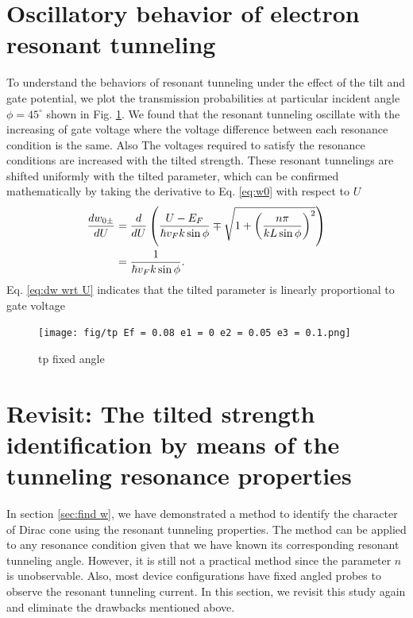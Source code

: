 \section{Oscillatory behavior of electron resonant tunneling} \label{sec:oscillation}
    To understand the behaviors of resonant tunneling under the effect of the tilt and gate potential, 
    we plot the transmission probabilities at particular incident angle $\phi = 45^{\circ}$ shown in Fig. \ref{fig:tp 45 deg}.
    We found that the resonant tunneling oscillate with the increasing of gate voltage where the voltage difference between each resonance condition is the same.
    Also The voltages required to satisfy the resonance conditions are increased with the tilted strength.
    These resonant tunnelings are shifted uniformly with the tilted parameter, which can be confirmed mathematically by taking the derivative to Eq. \ref{eq:w0} with respect to $U$
    \begin{align} \label{eq:dw wrt U}
        \frac{d w_{0\pm}}{dU} &= \frac{d}{dU} \left(\frac{U-E_F}{\hbar v_F k \sin{\phi}}\mp \sqrt{1+\left(\frac{n \pi}{k L \sin{\phi}}\right)^2}\right) \notag \\
                              &= \frac{1}{\hbar v_F k \sin{\phi}}.
    \end{align}
    Eq. \ref{eq:dw wrt U} indicates that the tilted parameter is linearly proportional to gate voltage
    \begin{figure}[H]
        \centering
            \texttt{[image: fig/tp Ef = 0.08 e1 = 0 e2 = 0.05 e3 = 0.1.png]}
            \caption{tp fixed angle}
        \label{fig:tp 45 deg}
    \end{figure}

\section{Revisit: The tilted strength identification by means of the tunneling resonance properties} \label{sec:find w 2}
    In section \ref{sec:find w}, we have demonstrated a method to identify the character of Dirac cone using the resonant tunneling properties.
    The method can be applied to any resonance condition given that we have known its corresponding resonant tunneling angle.
    However, it is still not a practical method since the parameter $n$ is unobservable.
    Also, most device configurations have fixed angled probes to observe the resonant tunneling current.
    In this section, we revisit this study again and eliminate the drawbacks mentioned above.
    
